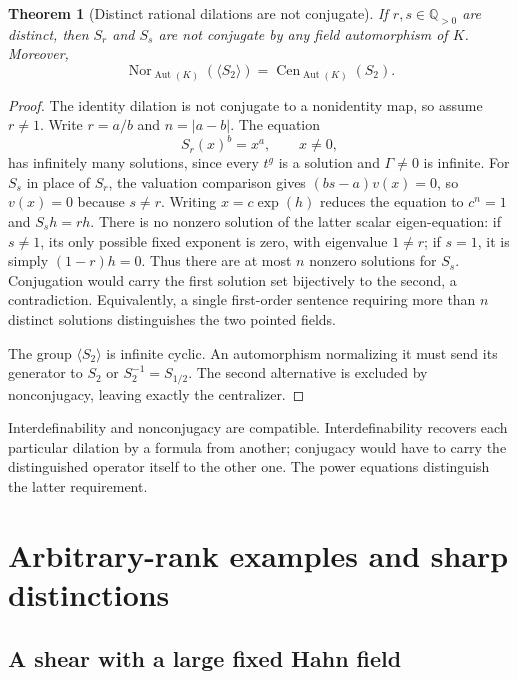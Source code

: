 \documentclass[11pt,oneside]{article}
\numberwithin{equation}{section}
\newtheorem{theorem}{Theorem}[section]
\theoremstyle{definition}
\theoremstyle{remark}
\newcommand{\Q}{\mathbb Q}
\newcommand{\Aut}{\operatorname{Aut}}
\DeclareMathOperator{\Cen}{Cen}
\DeclareMathOperator{\Nor}{Nor}
\begin{document}
\begin{theorem}[Distinct rational dilations are not conjugate]\label{dsup:thm:nonconjugate}
If $r,s\in\Q_{>0}$ are distinct, then $S_r$ and $S_s$ are not conjugate
by any field automorphism of $K$. Moreover,
\[
 \Nor_{\Aut(K)}(\langle S_2\rangle)
   =\Cen_{\Aut(K)}(S_2).
\]
\end{theorem}
\begin{proof}
The identity dilation is not conjugate to a nonidentity map, so assume
$r\ne1$. Write $r=a/b$ and $n=|a-b|$. The equation
\[
 S_r(x)^b=x^a,\qquad x\ne0,
\]
has infinitely many solutions, since every $t^g$ is a solution and
$\Gamma\ne0$ is infinite. For $S_s$ in place of $S_r$, the valuation
comparison gives $(bs-a)v(x)=0$, so $v(x)=0$ because $s\ne r$.
Writing $x=c\exp(h)$ reduces the equation to $c^n=1$ and $S_sh=rh$.
There is no nonzero solution of the latter scalar eigen-equation:
if $s\ne1$, its only possible fixed exponent is zero, with eigenvalue
$1\ne r$; if $s=1$, it is simply $(1-r)h=0$.
Thus there are at most $n$ nonzero solutions for $S_s$.
Conjugation would carry the first solution set bijectively to the second,
a contradiction. Equivalently, a single first-order sentence requiring
more than $n$ distinct solutions distinguishes the two pointed fields.

The group $\langle S_2\rangle$ is infinite cyclic. An automorphism
normalizing it must send its generator to $S_2$ or $S_2^{-1}=S_{1/2}$.
The second alternative is excluded by nonconjugacy, leaving exactly the
centralizer.
\end{proof}

Interdefinability and nonconjugacy are compatible. Interdefinability
recovers each particular dilation by a formula from another; conjugacy
would have to carry the distinguished operator itself to the other one.
The power equations distinguish the latter requirement.

\section{Arbitrary-rank examples and sharp distinctions}\label{dsup:sec:examples}

\subsection{A shear with a large fixed Hahn field}
\end{document}
